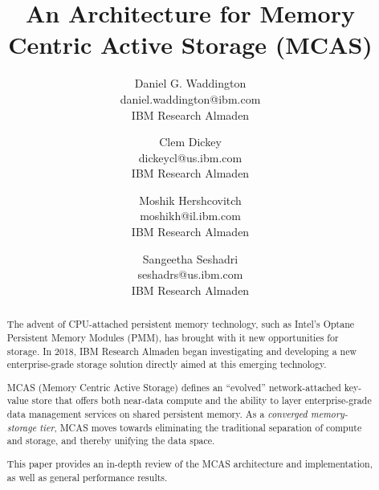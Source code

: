 \documentclass[letterpaper,twocolumn,10pt]{article}
\date{}
\title{\Large \bf An Architecture for Memory Centric Active Storage (MCAS)}
\author{
  {\rm Daniel G. Waddington}\\
  daniel.waddington@ibm.com \\
  IBM Research Almaden
\and
  {\rm Clem Dickey}\\
  dickeycl@us.ibm.com \\
  IBM Research Almaden
\and
  {\rm Moshik Hershcovitch}\\
  moshikh@il.ibm.com \\
  IBM Research Almaden
\and
  {\rm Sangeetha Seshadri}\\
  seshadrs@us.ibm.com \\
  IBM Research Almaden
} %
\begin{document}
\date{} %

\maketitle %


\begin{abstract}
  
The advent of CPU-attached persistent memory technology, such as
Intel's Optane Persistent Memory Modules (PMM), has brought with it new
opportunities for storage.  In 2018, IBM Research Almaden
began investigating and developing a new enterprise-grade storage
solution directly aimed at this emerging technology.

MCAS (Memory Centric Active Storage) defines an ``evolved''
network-attached key-value store that offers both near-data compute
and the ability to layer enterprise-grade data management services on
shared persistent memory.  As a \textit{converged memory-storage
  tier}, MCAS moves towards eliminating the
traditional separation of compute and storage, and thereby unifying
the data space.

This paper provides an in-depth review of the MCAS architecture and
implementation, as well as general performance results.

\end{abstract}


\end{document}
